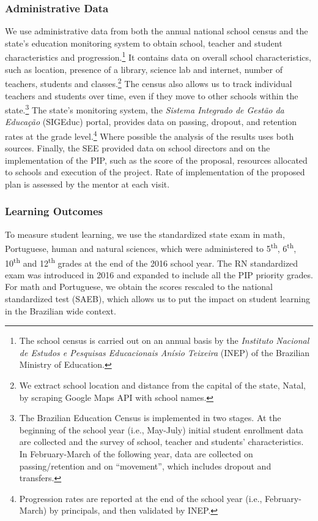 \documentclass[11pt,a4paper]{article}
\begin{document}
\subsubsection*{Administrative Data} 
We use administrative data from both the annual national school census and the state's education monitoring system to obtain school, teacher and student characteristics and progression.\footnote{The school census is carried out on an annual basis by the \textit{Instituto Nacional de Estudos e Pesquisas Educacionais Anísio Teixeira} (INEP) of the Brazilian Ministry of Education.} It contains data on overall school characteristics, such as location, presence of a library, science lab and internet, number of teachers, students and classes.\footnote{We extract school location and distance from the capital of the state, Natal, by scraping Google Maps API with school names.} The census also allows us to track individual teachers and students over time, even if they move to other schools within the state.\footnote{The Brazilian Education Census is implemented in two stages. At the beginning of the school year (i.e., May-July) initial student enrollment data are collected and the survey of school, teacher and students' characteristics. In February-March of the following year, data are collected on passing/retention and on ``movement'', which includes dropout and transfers.} The state's monitoring system, the \textit{Sistema Integrado de Gestão da Educação} (SIGEduc) portal, provides data on passing, dropout, and retention rates at the grade level.\footnote{Progression rates are reported at the end of the school year (i.e., February-March) by principals, and then validated by INEP.} Where possible the analysis of the results uses both sources. Finally, the SEE provided data on school directors and on the implementation of the PIP, such as the score of the proposal, resources allocated to schools and execution of the project. Rate of implementation of the proposed plan is assessed by the mentor at each visit.  

\subsubsection*{Learning Outcomes}
To measure student learning, we use the standardized state exam in math, Portuguese, human and natural sciences, which were administered to 5\textsuperscript{th}, 6\textsuperscript{th}, 10\textsuperscript{th} and 12\textsuperscript{th} grades at the end of the 2016 school year. The RN standardized exam was introduced in 2016 and expanded to include all the PIP priority grades. For math and Portuguese, we obtain the scores rescaled to the national standardized test (SAEB), which allows us to put the impact on student learning in the Brazilian wide context. 
\end{document}
